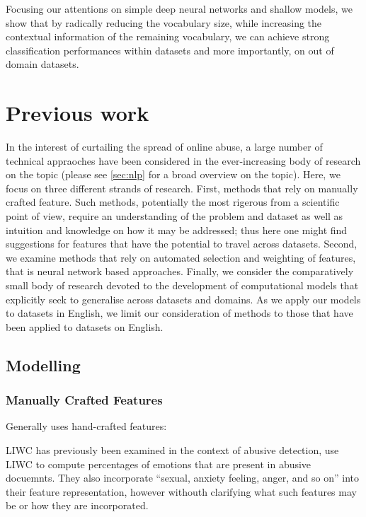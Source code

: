 Focusing our attentions on simple deep neural networks and shallow models, we show that by radically reducing the vocabulary size, while increasing the contextual information of the remaining vocabulary, we can achieve strong classification performances within datasets and more importantly, on out of domain datasets.

\section{Previous work}

In the interest of curtailing the spread of online abuse, a large number of technical appraoches have been considered in the ever-increasing body of research on the topic (please see \autoref{sec:nlp} for a broad overview on the topic). Here, we focus on three different strands of research. First, methods that rely on manually crafted feature. Such methods, potentially the most rigerous from a scientific point of view, require an understanding of the problem and dataset as well as intuition and knowledge on how it may be addressed; thus here one might find suggestions for features that have the potential to travel across datasets. Second, we examine methods that rely on automated selection and weighting of features, that is neural network based approaches. Finally, we consider the comparatively small body of research devoted to the development of computational models that explicitly seek to generalise across datasets and domains. As we apply our models to datasets in English, we limit our consideration of methods to those that have been applied to datasets on English.

\subsection{Modelling}
\subsubsection{Manually Crafted Features}

Generally uses hand-crafted features: \cite{Davidson:2017,Waseem:2017,Ibrohim:2019,Vega:2019,Wiegand:2018,Tian:2020,Kumar:2019}

LIWC has previously been examined in the context of abusive detection, \citet{Nina-Alcocer:2019} use LIWC to compute percentages of emotions that are present in abusive docuemnts. They also incorporate ``sexual, anxiety feeling, anger, and so on'' into their feature representation, however withouth clarifying what such features may be or how they are incorporated.

